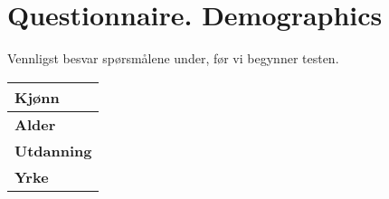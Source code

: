 \chapter{Questionnaire. Demographics}
\label{app:questionnaire}

Vennligst besvar sp\o rsm\r{a}lene under, f\o r vi begynner testen.
\begin{center}
	\begin{tabular}{ | p{10.0cm} |}
	\hline
	\textbf{Kj\o nn} \\[5ex] \hline
	\textbf{Alder} \\[5ex] \hline
	\textbf{Utdanning} \\[5ex] \hline
	\textbf{Yrke} \\[5ex] \hline
	\end{tabular}
\end{center}